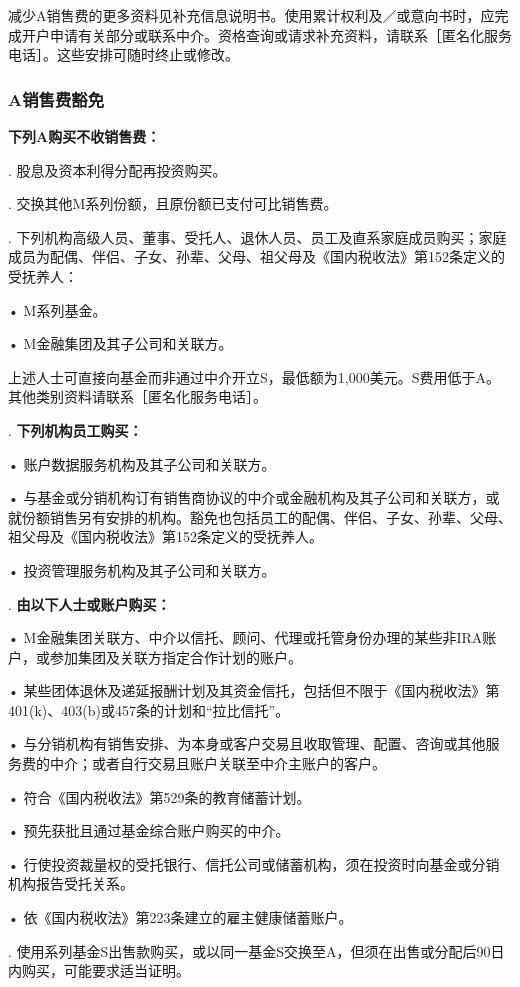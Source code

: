 \documentclass[UTF8,fontset=none,11pt,a4paper]{ctexart}
\begin{document}
减少A销售费的更多资料见补充信息说明书。使用累计权利及／或意向书时，应完成开户申请有关部分或联系中介。资格查询或请求补充资料，请联系［匿名化服务电话］。这些安排可随时终止或修改。

\subsubsection*{A销售费豁免}
\textbf{下列A购买不收销售费：}

. 股息及资本利得分配再投资购买。


. 交换其他M系列份额，且原份额已支付可比销售费。


. 下列机构高级人员、董事、受托人、退休人员、员工及直系家庭成员购买；家庭成员为配偶、伴侣、子女、孙辈、父母、祖父母及《国内税收法》第152条定义的受抚养人：


\noindent • M系列基金。\par\smallskip
\noindent • M金融集团及其子公司和关联方。\par\smallskip

\par{}\label{originalpage15}
上述人士可直接向基金而非通过中介开立S，最低额为1,000美元。S费用低于A。其他类别资料请联系［匿名化服务电话］。

. \textbf{下列机构员工购买：}


\noindent • 账户数据服务机构及其子公司和关联方。\par\smallskip
\noindent • 与基金或分销机构订有销售商协议的中介或金融机构及其子公司和关联方，或就份额销售另有安排的机构。豁免也包括员工的配偶、伴侣、子女、孙辈、父母、祖父母及《国内税收法》第152条定义的受抚养人。\par\smallskip
\noindent • 投资管理服务机构及其子公司和关联方。\par\smallskip
{}. \textbf{由以下人士或账户购买：}


\noindent • M金融集团关联方、中介以信托、顾问、代理或托管身份办理的某些非IRA账户，或参加集团及关联方指定合作计划的账户。\par\smallskip
\noindent • 某些团体退休及递延报酬计划及其资金信托，包括但不限于《国内税收法》第401(k)、403(b)或457条的计划和“拉比信托”。\par\smallskip
\noindent • 与分销机构有销售安排、为本身或客户交易且收取管理、配置、咨询或其他服务费的中介；或者自行交易且账户关联至中介主账户的客户。\par\smallskip
\noindent • 符合《国内税收法》第529条的教育储蓄计划。\par\smallskip
\noindent • 预先获批且通过基金综合账户购买的中介。\par\smallskip
\noindent • 行使投资裁量权的受托银行、信托公司或储蓄机构，须在投资时向基金或分销机构报告受托关系。\par\smallskip
\noindent • 依《国内税收法》第223条建立的雇主健康储蓄账户。\par\smallskip
{}. 使用系列基金S出售款购买，或以同一基金S交换至A，但须在出售或分配后90日内购买，可能要求适当证明。
\end{document}
